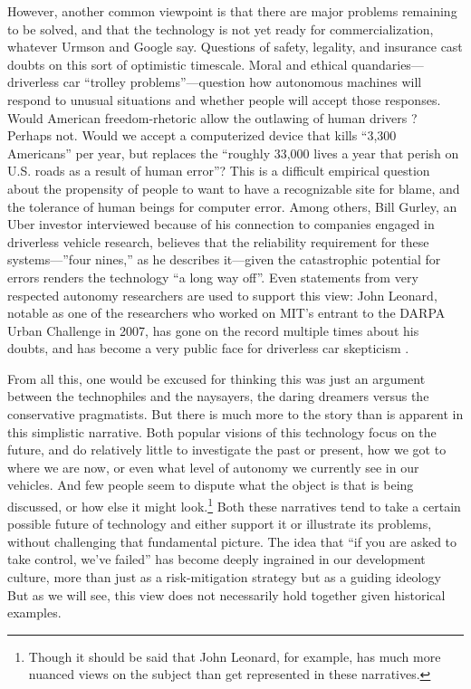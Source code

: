 However, another common viewpoint is that there are major problems remaining to be
solved, and that the technology is not yet ready for
commercialization, whatever Urmson and Google 
say. Questions of safety, legality, and insurance cast doubts on this
sort of optimistic timescale. Moral and ethical
quandaries---driverless car ``trolley problems''---question how
autonomous machines will respond to unusual situations and whether
people will accept those responses. Would American freedom-rhetoric
allow the outlawing of human drivers \cite{badgerElon}? 
Perhaps not. Would we accept a computerized device that kills ``3,300
Americans'' per year, but replaces the ``roughly 33,000 lives a year
that perish on U.S. roads as a result of human
error''\cite{mcfarlandDriverless}?
This is a difficult empirical question about the propensity of people
to want to have a recognizable site for blame, and the tolerance of
human beings for computer error. Among others, Bill Gurley, an Uber
investor interviewed because of his connection to companies engaged in
driverless vehicle research, believes that the reliability requirement
for these systems---''four nines,'' as he describes it---given the
catastrophic potential for errors renders the technology ``a long way
off''\cite{shontellTop}.
Even statements from very respected autonomy researchers are used to
support this view: John Leonard, notable as one of the researchers who
worked on MIT's entrant to the DARPA Urban Challenge in 2007, has gone
on the record multiple times about his doubts, and has become a very
public face for driverless car skepticism \cite{ramseyWhen} \cite{gomesCircles}.

From all this, one would be excused for thinking this was just an
argument between the technophiles and the naysayers, the daring dreamers versus the
conservative pragmatists. But there is much more to the story than is
apparent in this simplistic narrative. Both popular visions of this
technology focus on the future, and do relatively little to
investigate the past or present, how we got to 
where we are now, or even what level of autonomy we currently see in
our vehicles. And few people seem to dispute what the object is that is
being discussed, or how else it might look.\footnote{Though it should
  be said that John Leonard, for example, has much more nuanced views
  on the subject than get represented in these narratives.} Both these narratives 
tend to take a certain possible future of technology and either support it
or illustrate its problems, without challenging that fundamental
picture. The idea that ``if you are asked to take control, we've
failed'' has become deeply ingrained in our development
culture, more than just as a risk-mitigation strategy but as a guiding
ideology But as we will see, this view does not necessarily hold together given
historical examples.

